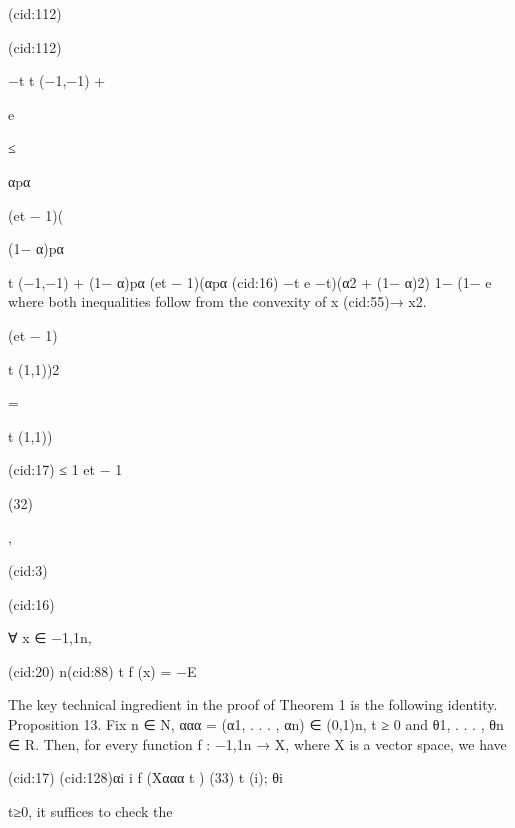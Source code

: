 {(cid:112)

(cid:112)

−t
t (−1,−1) +

e

≤

αpα

(et − 1)(

(1− α)pα

t (−1,−1) + (1− α)pα
(et − 1)(αpα
(cid:16)
−t
e
−t)(α2 + (1− α)2)
1− (1− e
where both inequalities follow from the convexity of x (cid:55)→ x2.

(et − 1)

t (1,1))2

=

t (1,1))

(cid:17) ≤ 1
et − 1

(32)

,

(cid:3)

(cid:16)

∀ x ∈ {−1,1}n,

(cid:20) n(cid:88)
t f (x) = −E

The key technical ingredient in the proof of Theorem 1 is the following identity.
Proposition 13. Fix n ∈ N, ααα = (α1, . . . , αn) ∈ (0,1)n, t ≥ 0 and θ1, . . . , θn ∈ R. Then, for every
function f : {−1,1}n → X, where X is a vector space, we have

(cid:17)
(cid:128)αi
i f (Xααα
t )
(33)
t (i); θi
}t≥0, it suﬃces to check the
